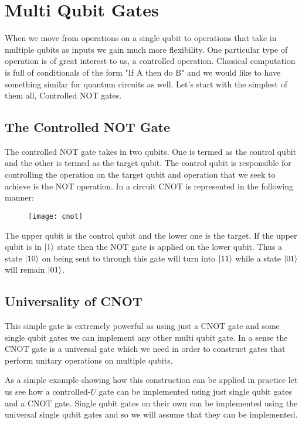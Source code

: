 \chapter{Multi Qubit Gates}

When we move from operations on a single qubit to operations that take in multiple qubits as inputs we gain much more flexibility. One particular type of operation is of great interest to us, a controlled operation. Classical computation is full of conditionals of the form "If A then do B" and we would like to have something similar for quantum circuits as well. Let's start with the simplest of them all, Controlled NOT gates.

\section{The Controlled NOT Gate}

The controlled NOT gate takes in two qubits. One is termed as the control qubit and the other is termed as the target qubit. The control qubit is responsible for controlling the operation on the target qubit and operation that we seek to achieve is the NOT operation. In a circuit CNOT is represented in the following manner:


\begin{figure}[htp]
    \centering
    \texttt{[image: cnot]}
\end{figure}

The upper qubit is the control qubit and the lower one is the target. If the upper qubit is in $\ket{1}$ state then the NOT gate is applied on the lower qubit. Thus a state $\ket{10}$ on being sent to through this gate will turn into $\ket{11}$ while a state $\ket{01}$ will remain $\ket{01}$.

\section{Universality of CNOT}
This simple gate is extremely powerful as using just a CNOT gate and some single qubit gates we can implement any other multi qubit gate. In a sense the CNOT gate is a universal gate which we need in order to construct gates that perform unitary operations on multiple qubits.

As a simple example showing how this construction can be applied in practice let us see how a controlled-$U$ gate can be implemented using just single qubit gates and a CNOT gate. Single qubit gates on their own can be implemented using the universal single qubit gates and so we will assume that they can be implemented.

